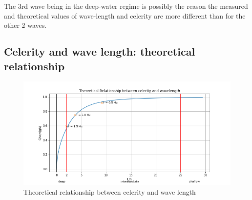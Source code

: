 \documentclass{article}
\begin{document}
	The 3rd wave being in the deep-water regime is possibly the reason the measured and theoretical values of wave-length and celerity are more different than for the other 2 waves.
	\subsection{Celerity and wave length: theoretical relationship}
	\begin{figure}[H]
		\centering
		\includegraphics[width=\textwidth]{../graphs/celerityvslength.png}
		\caption{Theoretical relationship between celerity and wave length}
		\label{celerityvslength}
	\end{figure}
\end{document}
